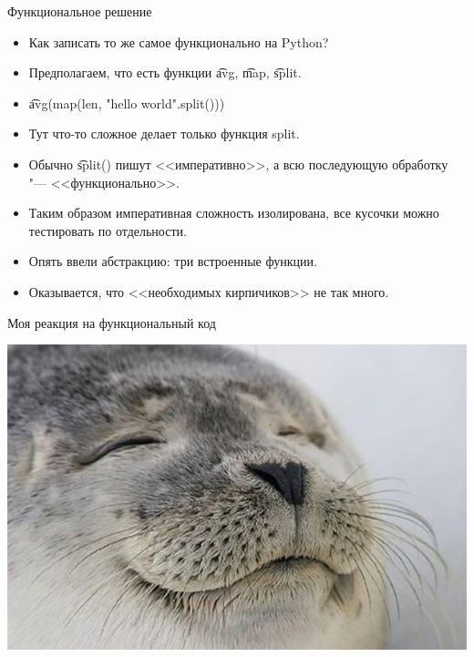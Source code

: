 \begin{frame}{Функциональное решение}
	\begin{itemize}
		\item Как записать то же самое функционально на Python? \pause
		\item Предполагаем, что есть функции \t{avg}, \t{map}, \t{split}. \pause
		\item \t{avg(map(len, "hello world".split()))} \pause
		\item Тут что-то сложное делает только функция split.
		\item Обычно \t{split()} пишут <<императивно>>, а всю последующую обработку "--- <<функционально>>.
		\item Таким образом императивная сложность изолирована, все кусочки можно тестировать по отдельности.
		\item Опять ввели абстракцию: три встроенные функции.
		\item Оказывается, что <<необходимых кирпичиков>> не так много.
	\end{itemize}
\end{frame}

\begin{frame}{Моя реакция на функциональный код}
	\begin{center}
		\includegraphics[scale=0.3]{satisfied-seal.jpg}
	\end{center}
\end{frame}
